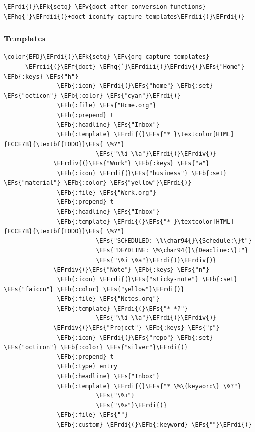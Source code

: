 \documentclass{scrartcl}
\newcommand{\EFk}[1]{\textcolor{EFk}{#1}} %
\newcommand{\EFs}[1]{\textcolor{EFs}{#1}} %
\newcommand{\EFb}[1]{\textcolor{EFb}{#1}} %
\newcommand{\EFv}[1]{\textcolor{EFv}{#1}} %
\newcommand{\EFf}[1]{\textcolor{EFf}{#1}} %
\newcommand{\EFhq}[1]{#1} %
\newcommand{\EFrdi}[1]{#1} %
\newcommand{\EFrdii}[1]{#1} %
\newcommand{\EFrdiii}[1]{#1} %
\newcommand{\EFrdiv}[1]{#1} %
\begin{document}
\begin{Code}
\begin{Verbatim}[]
\EFrdi{(}\EFk{setq} \EFv{doct-after-conversion-functions} \EFhq{'}\EFrdii{(}+doct-iconify-capture-templates\EFrdii{)}\EFrdi{)}
\end{Verbatim}
\end{Code}

\subsubsection{Templates}
\label{sec:org1e9fbf7}
\begin{Code}
\begin{Verbatim}[]
\color{EFD}\EFrdi{(}\EFk{setq} \EFv{org-capture-templates}
      \EFrdii{(}\EFf{doct} \EFhq{`}\EFrdiii{(}\EFrdiv{(}\EFs{"Home"} \EFb{:keys} \EFs{"h"}
               \EFb{:icon} \EFrdi{(}\EFs{"home"} \EFb{:set} \EFs{"octicon"} \EFb{:color} \EFs{"cyan"}\EFrdi{)}
               \EFb{:file} \EFs{"Home.org"}
               \EFb{:prepend} t
               \EFb{:headline} \EFs{"Inbox"}
               \EFb{:template} \EFrdi{(}\EFs{"* }\textcolor[HTML]{FCCE7B}{\textbf{TODO}}\EFs{ \%?"}
                          \EFs{"\%i \%a"}\EFrdi{)}\EFrdiv{)}
              \EFrdiv{(}\EFs{"Work"} \EFb{:keys} \EFs{"w"}
               \EFb{:icon} \EFrdi{(}\EFs{"business"} \EFb{:set} \EFs{"material"} \EFb{:color} \EFs{"yellow"}\EFrdi{)}
               \EFb{:file} \EFs{"Work.org"}
               \EFb{:prepend} t
               \EFb{:headline} \EFs{"Inbox"}
               \EFb{:template} \EFrdi{(}\EFs{"* }\textcolor[HTML]{FCCE7B}{\textbf{TODO}}\EFs{ \%?"}
                          \EFs{"SCHEDULED: \%\char94{}\{Schedule:\}t"}
                          \EFs{"DEADLINE: \%\char94{}\{Deadline:\}t"}
                          \EFs{"\%i \%a"}\EFrdi{)}\EFrdiv{)}
              \EFrdiv{(}\EFs{"Note"} \EFb{:keys} \EFs{"n"}
               \EFb{:icon} \EFrdi{(}\EFs{"sticky-note"} \EFb{:set} \EFs{"faicon"} \EFb{:color} \EFs{"yellow"}\EFrdi{)}
               \EFb{:file} \EFs{"Notes.org"}
               \EFb{:template} \EFrdi{(}\EFs{"* *?"}
                          \EFs{"\%i \%a"}\EFrdi{)}\EFrdiv{)}
              \EFrdiv{(}\EFs{"Project"} \EFb{:keys} \EFs{"p"}
               \EFb{:icon} \EFrdi{(}\EFs{"repo"} \EFb{:set} \EFs{"octicon"} \EFb{:color} \EFs{"silver"}\EFrdi{)}
               \EFb{:prepend} t
               \EFb{:type} entry
               \EFb{:headline} \EFs{"Inbox"}
               \EFb{:template} \EFrdi{(}\EFs{"* \%\{keyword\} \%?"}
                          \EFs{"\%i"}
                          \EFs{"\%a"}\EFrdi{)}
               \EFb{:file} \EFs{""}
               \EFb{:custom} \EFrdi{(}\EFb{:keyword} \EFs{""}\EFrdi{)}

\end{Verbatim}
\end{Code}
\end{document}

